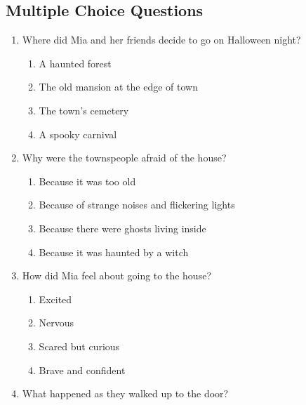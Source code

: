 \documentclass[12pt]{article}
\begin{document}
\subsection*{Multiple Choice Questions}

\begin{enumerate}

    \item Where did Mia and her friends decide to go on Halloween night?

    \begin{enumerate}[label=\Alph*.]
        \item A haunted forest
        \item The old mansion at the edge of town
        \item The town’s cemetery
        \item A spooky carnival
    \end{enumerate}
    
    \vspace{0.5cm}

    \item Why were the townspeople afraid of the house?

    \begin{enumerate}[label=\Alph*.]
        \item Because it was too old
        \item Because of strange noises and flickering lights
        \item Because there were ghosts living inside
        \item Because it was haunted by a witch
    \end{enumerate}
    
    \vspace{0.5cm}

    \item How did Mia feel about going to the house?

    \begin{enumerate}[label=\Alph*.]
        \item Excited
        \item Nervous
        \item Scared but curious
        \item Brave and confident
    \end{enumerate}
    
    \vspace{0.5cm}

    \item What happened as they walked up to the door?


\end{enumerate}
\end{document}
